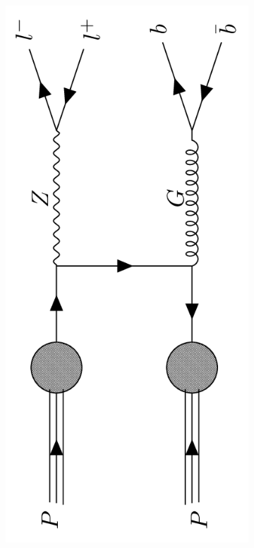 \begin{figure}
{\begin{subfigure}{.2\textwidth}
        \caption{}
        \label{fig:w_pjets}
    \end{subfigure}
    \hfill
    \begin{subfigure}{.2\textwidth}
        \includegraphics[width=\textwidth, angle = -90]{Figures/Z_pjets.png}
        \caption{}
        \label{fig:z_pjets}
    \end{subfigure}
    }
    \caption{}
\end{figure}